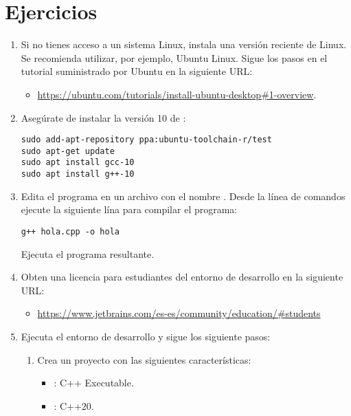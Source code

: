 \section{Ejercicios}

\begin{enumerate}

\item Si no tienes acceso a un sistema Linux, instala una versión reciente de Linux.
Se recomienda utilizar, por ejemplo, Ubuntu Linux. Sigue los pasos en el tutorial
suministrado por Ubuntu en la siguiente URL:

  \begin{itemize}
    \item \url{https://ubuntu.com/tutorials/install-ubuntu-desktop#1-overview}.
  \end{itemize}

\item Asegúrate de instalar la versión 10 de :

\begin{lstlisting}[style=terminal]
sudo add-apt-repository ppa:ubuntu-toolchain-r/test
sudo apt-get update
sudo apt install gcc-10
sudo apt install g++-10
\end{lstlisting}

\item Edita el programa en un archivo con el nombre . Desde la 
línea de comandos ejecute la siguiente lína para compilar el programa:

\begin{lstlisting}[style=terminal]
g++ hola.cpp -o hola
\end{lstlisting}

Ejecuta el programa resultante.

\item Obten una licencia para estudiantes del entorno de desarrollo 
en la siguiente URL:
\begin{itemize}
  \item \url{https://www.jetbrains.com/es-es/community/education/#students}
\end{itemize}

\item Ejecuta el entorno de desarrollo  y sigue los siguiente pasos:

\begin{enumerate}
\item Crea un proyecto con las siguientes características:
\begin{itemize}
  \item {}: C++ Executable.
  \item {}: C++20.
\end{itemize}


\end{enumerate}
\end{enumerate}

